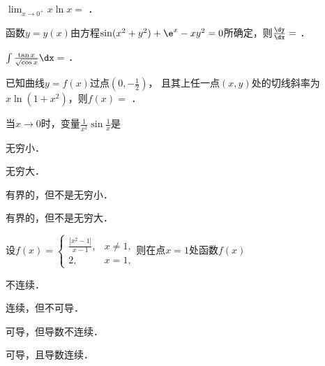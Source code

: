 \documentclass[plain,noanswer,medmath]{../../template/jnuexam}
\begin{document}






\begin{problem}
$\lim_{x \to 0^+} x\ln x =$ \fillin{}．
\end{problem}


\begin{problem}
函数$y = y(x)$由方程$\sin (x^2 + y^2) + \e^x - xy^2 = 0$所确定，则$\frac{\dy}{\dx} =$ \fillin{}．
\end{problem}




\begin{problem}
$\int \frac{\tan x}{\sqrt{\cos x}} \dx =$ \fillin{}．
\end{problem}


\begin{problem}
已知曲线$y = f(x)$过点$\left(0, - \frac{1}{2} \right)$，
且其上任一点$(x,y)$处的切线斜率为$x\ln(1 + x^2)$，则$f(x)=$ \fillin{}．
\end{problem}




\begin{problem}
当$x \to 0$时，变量$\frac{1}{x^2}\sin \frac{1}{x}$是\pickout{}
\begin{abcd}
\item 无穷小．						
\item 无穷大．
\item 有界的，但不是无穷小．		
\item 有界的，但不是无穷大．
\end{abcd}
\end{problem}


\begin{problem}
设$f(x) = \begin{cases}
 \frac{|x^2-1|}{x-1}, & x \ne 1, \\
                   2, & x = 1,
\end{cases}$则在点$x=1$处函数$f(x)$\pickout{}
\begin{abcd}
\item 不连续．
\item 连续，但不可导．
\item 可导，但导数不连续．
\item 可导，且导数连续．
\end{abcd}
\end{problem}
\end{document}
